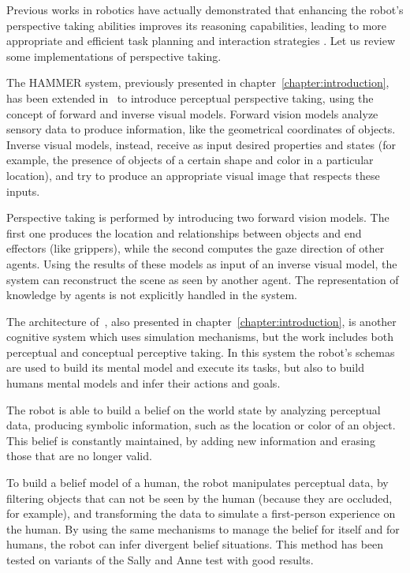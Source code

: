 Previous works in robotics have actually demonstrated that enhancing the robot's perspective taking abilities improves its reasoning capabilities, leading to more appropriate and efficient task planning and interaction strategies \citep{Trafton2005,ros2010one,breazeal2006}. Let us review some implementations of perspective taking.

The HAMMER system, previously presented in chapter~\ref{chapter:introduction}, has been extended in~\cite{johnson2005perceptual} to introduce perceptual perspective taking, using the concept of forward and inverse visual models. Forward vision models analyze sensory data to produce information, like the geometrical coordinates of objects. Inverse visual models, instead, receive as input desired properties and states (for example, the presence of objects of a certain shape and color in a particular location), and try to produce an appropriate visual image that respects these inputs.

Perspective taking is performed by introducing two forward vision models. The first one produces the location and relationships between objects and end effectors (like grippers), while the second  computes the gaze direction of other agents. Using the results of these models as input of an inverse visual model, the system can reconstruct the scene as seen by another agent. The representation of knowledge by agents is not explicitly handled in the system. 

The architecture of~\cite{BreazealGB09}, also presented in chapter~\ref{chapter:introduction}, is another cognitive system which uses simulation mechanisms, but the work  includes both perceptual and conceptual perceptive taking. In this system the robot's schemas are used to build its mental model and execute its tasks, but also to build humans mental models and infer their actions and goals.

The robot is able to build a belief on the world state by analyzing perceptual data, producing symbolic information, such as the location or color of an object. This belief is constantly maintained, by adding new information and erasing those that are no longer valid.

To build a belief model of a human, the robot manipulates perceptual data, by filtering objects that can not be seen by the human (because they are occluded, for example), and transforming the data to simulate a first-person experience on the human. By using the same mechanisms to manage the belief for itself and for humans, the robot can infer divergent belief situations. This method has been tested on variants of the Sally and Anne test with good results.

